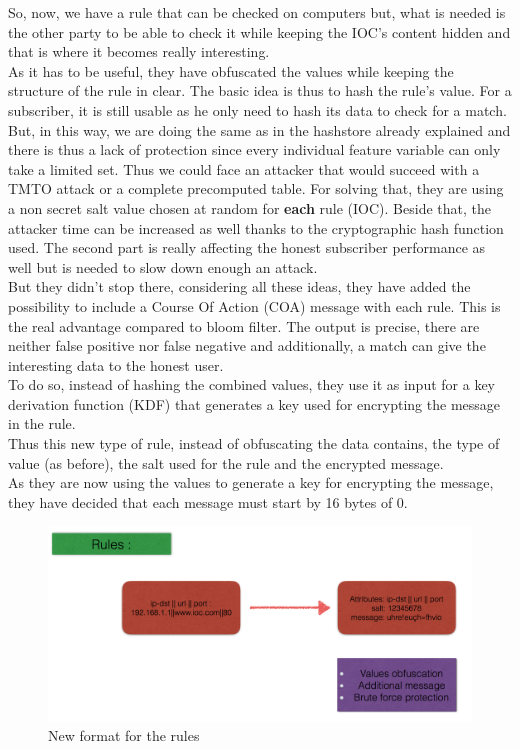 \documentclass{eplmastersthesis}
\begin{document}
So, now, we have a rule that can be checked on computers but, what is needed is the other party to be able to check it while keeping the IOC's content hidden and that is where it becomes really interesting.\\
As it has to be useful, they have obfuscated the values while keeping the structure of the rule in clear. The basic idea is thus to hash the rule's value. For a subscriber, it is still usable as he only need to hash its data to check for a match. But, in this way, we are doing the same as in the hashstore already explained and there is thus a lack of protection since every individual feature variable can only take a limited set.
Thus we could face an attacker that would succeed with a TMTO attack or a complete precomputed table.
For solving that, they are using a non secret salt value chosen at random for \textbf{each} rule (IOC). Beside that, the attacker time can be increased as well thanks to the cryptographic hash function used. The second part is really affecting the honest subscriber performance as well but is needed to slow down enough an attack.\\

But they didn't stop there, considering all these ideas, they have added the possibility to include a Course Of Action (COA) message with each rule. This is the real advantage compared to bloom filter. The output is precise, there are neither false positive nor false negative and additionally, a match can give the interesting data to the honest user.\\ To do so, instead of hashing the combined values, they use it as input for a key derivation function (KDF) that generates a key used for encrypting the message in the rule.\\
Thus this new type of rule, instead of obfuscating the data contains, the type of value (as before), the salt used for the rule and the encrypted message.\\
As they are now using the values to generate a key for encrypting the message, they have decided that each message must start by 16 bytes of 0.\\ 


\begin{figure}[h!]
\begin{center}
	\includegraphics[scale=0.3]{res/obfuscation-rule}
	\caption{New format for the rules}
	\label{Obfuscation-Rule}
\end{center}
\end{figure}
\end{document}

